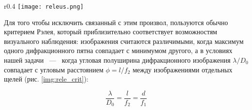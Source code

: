 \begin{wrapfigure}{r}{0.4\linewidth} %
  \texttt{[image: releus.png]}
  \caption{Критерий разрешения по Рэлею}
  \label{img:rele_crit}
\end{wrapfigure}

Для того чтобы исключить связанный
с этим произвол, пользуются обычно критерием Рэлея,
который приблизительно соответствует возможностям визуального наблюдения: изображения считаются различимыми,
когда максимум одного дифракционного пятна совпадает с минимумом другого,
а в условиях нашей задачи ~---~ когда угловая полуширина дифракционного изображения $\lambda/D_0$ совпадает с угловым расстоянием
$\phi= l/f_2$ между изображениями отдельных щелей (рис. \ref{img:rele_crit}):

\begin{equation}
  \frac{\lambda}{D_0} = \frac{l}{f_2} = \frac{d}{f_1}
\end{equation}\label{eq:angle_dist}
